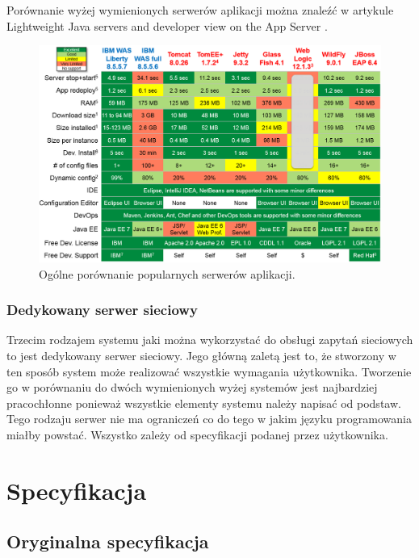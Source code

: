 \documentclass[archivemod, eng]{mgr}
\begin{document}
			Porównanie wyżej wymienionych serwerów aplikacji można znaleźć w artykule Lightweight Java servers and developer view on the App Server \cite{javaserverscomparison}.
		
			\begin{center}
				\begin{figure}[H]
					\centering
					\includegraphics[scale=0.6]{weblogic-jboss-wildfly-websphere-liberty-tomee-tomcat-glassfish-comparison1.png}
					\caption{Ogólne porównanie popularnych serwerów aplikacji. \cite{javaserverscomparison}}
				\end{figure}
			\end{center}
		
			\subsection{Dedykowany serwer sieciowy}
			Trzecim rodzajem systemu jaki można wykorzystać do obsługi zapytań sieciowych to jest dedykowany serwer sieciowy. Jego główną zaletą jest to, że stworzony w ten sposób system może realizować wszystkie wymagania użytkownika. Tworzenie go w porównaniu do dwóch wymienionych wyżej systemów jest najbardziej pracochłonne ponieważ wszystkie elementy systemu należy napisać od podstaw. Tego rodzaju serwer nie ma ograniczeń co do tego w jakim języku programowania miałby powstać. Wszystko zależy od specyfikacji podanej przez użytkownika.
			
	
	\chapter{Specyfikacja}
	
		\section{Oryginalna specyfikacja}
		
\end{document}
